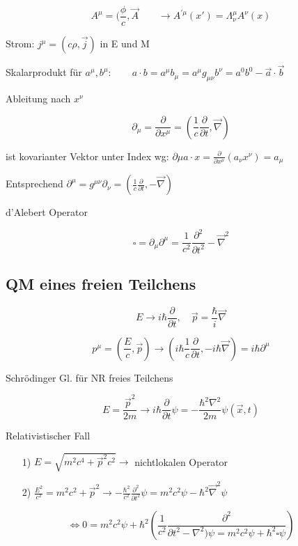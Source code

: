 \[A^\mu = (\frac{\phi}{c},\vec A \qquad \rightarrow  A^{'\mu}(x') = \Lambda^\mu_\nu A^\nu(x)\]

Strom: \(j^\mu = (c\rho,\vec j)\) in E und M

Skalarprodukt für \(a^\mu,b^\mu: \qquad a\cdot b = a^\mu b_\mu = a^\mu g_{\mu\nu}b^\nu = a^0 b^0 - \vec a\cdot \vec b\)

Ableitung nach \(x^\nu\)

\[\partial_\mu = \frac{\partial}{\partial x^\mu} = (\frac{1}{c} \frac{\partial}{\partial t},\vec \nabla )\]

ist kovarianter Vektor unter Index wg: \(\partial \mu a\cdot x = \frac{\partial}{\partial x^\mu}(a_\nu x^\nu)= a_\mu\)

Entsprechend \(\partial^\mu = g^{\mu\nu}\partial_\nu = (\frac{1}{c}\frac{\partial}{\partial t},-\vec\nabla)\)


d'Alebert Operator

\[\square = \partial_\mu\partial^\mu = \frac{1}{c^2} \frac{\partial^2}{\partial t^2} - \vec \nabla^2\]

\subsection{QM eines freien Teilchens}

\[E\rightarrow i\hbar\frac{\partial}{\partial t}, \quad \vec p = \frac{\hbar}{i}\vec \nabla\]

\[ p^\mu = (\frac{E}{c},\vec p) \rightarrow (i\hbar \frac{1}{c}\frac{\partial}{\partial t},-i\hbar \vec \nabla) = i\hbar\partial^\mu\]

Schrödinger Gl. für NR freies Teilchens

\[E=\frac{\vec p^2}{2m} \rightarrow  i\hbar \frac{\partial }{\partial t}\psi = -\frac{\hbar^2\nabla^2}{2m}\psi(\vec x,t) \]


Relativistischer Fall

\begin{enumerate}
\item[1)] \(E = \sqrt{m^2c^4+\vec p^2c^2} \rightarrow \) nichtlokalen Operator
\item[2)] \(\frac{E^2}{c^2} = m^2c^2 + \vec p^2 \rightarrow - \frac{\hbar^2}{c^2}\frac{\partial^2 }{\partial t^2}\psi = m^2c^2\psi -\hbar^2\vec \nabla^2\psi \)
\end{enumerate}

\[\Leftrightarrow  0 = m^2c^2\psi + \hbar^2(\frac{1}{c^2}\frac{\partial^2}{\partial t^2 - \nabla^2)\psi = m^2c^2\psi+\hbar^2 \square \psi})\]


